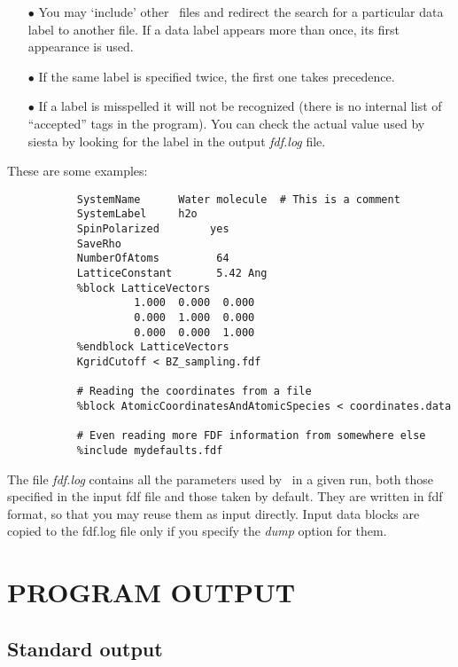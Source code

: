 \begin{itemize}
\item[$\bullet$] You may `include' other \fdflib\ files and redirect the search
for a particular data label to another file.
If a data label appears more than once, its first appearance
is used.

\item[$\bullet$] If the same label is specified twice, the first one takes precedence.

\item[$\bullet$] If a label is misspelled it will not be recognized (there is no
  internal list of ``accepted'' tags in the program). You can check 
  the actual value used by siesta by looking for the label in the
  output \textit{fdf.log} file.

\end{itemize}

\noindent
These are some examples:

\begin{verbatim}
           SystemName      Water molecule  # This is a comment
           SystemLabel     h2o
           SpinPolarized        yes
           SaveRho
           NumberOfAtoms         64
           LatticeConstant       5.42 Ang
           %block LatticeVectors
                    1.000  0.000  0.000
                    0.000  1.000  0.000
                    0.000  0.000  1.000
           %endblock LatticeVectors
           KgridCutoff < BZ_sampling.fdf

           # Reading the coordinates from a file
           %block AtomicCoordinatesAndAtomicSpecies < coordinates.data

           # Even reading more FDF information from somewhere else
           %include mydefaults.fdf
\end{verbatim}

The file \textit{fdf.log} contains all the parameters used by \siesta\
in a given run, both those specified in the input fdf file and
those taken by default. They are written in fdf format, so that
you may reuse them as input directly. Input data blocks are
copied to the fdf.log file only if you specify the \textit{dump} option
for them.

\section{PROGRAM OUTPUT}

\subsection{Standard output} 

